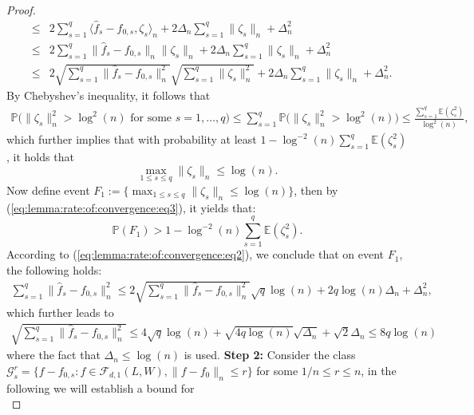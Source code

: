 \documentclass[11pt, preprint]{imsart}
\numberwithin{equation}{section}
\def \mcF{\mathcal{F}}
\def \mcG{\mathcal{G}}
\def \ev{\mathbb{E}}
\def \pr{\mathbb{P}}
\theoremstyle{plain}
\theoremstyle{definition}
\begin{document}
\begin{proof}
\begin{eqnarray}
&\leq&2\sum_{s=1}^q\langle \widehat{f}_s- f_{0,s}, \zeta_s  \rangle_n+2\Delta_n\sum_{s=1}^q \|\zeta_s  \|_n+\Delta_n^2\nonumber\\
&\leq& 2\sum_{s=1}^q\|\widehat{f}_s- f_{0,s}\|_n \|\zeta_s\|_n+2\Delta_n\sum_{s=1}^q \|\zeta_s  \|_n+\Delta_n^2\nonumber\\
&\leq&  2\sqrt{\sum_{s=1}^q\|\widehat{f}_s- f_{0,s}\|_n^2} \sqrt{\sum_{s=1}^q\|\zeta_s\|_n^2}+2\Delta_n\sum_{s=1}^q \|\zeta_s  \|_n+\Delta_n^2.\label{eq:lemma:rate:of:convergence:eq2}
\end{eqnarray}
By Chebyshev’s inequality, it follows that
\begin{eqnarray*}
\pr\bigg(\|\zeta_s\|_n^2>\log^2(n) \textrm{ for some } s=1,\ldots, q\bigg)\leq \sum_{s=1}^q\pr\bigg(\|\zeta_s\|_n^2>\log^2(n)\bigg)\leq \frac{\sum_{s=1}^q\ev(\zeta_s^2)}{\log^2(n)},\nonumber
\end{eqnarray*}
which further implies that with probability at least $1-\log^{-2}(n)\sum_{s=1}^q\ev(\zeta_s^2)$, it holds that
\begin{equation}\label{eq:lemma:rate:of:convergence:eq3}
	\max_{1\leq s\leq q}\|\zeta_s\|_n\leq \log(n).
\end{equation}
Now define event $F_1:=\{\max_{1\leq s\leq q}\|\zeta_s\|_n\leq \log(n)\}$, then by (\ref{eq:lemma:rate:of:convergence:eq3}), it yields that:
\begin{equation}\label{eq:lemma:rate:of:convergence:F1}
	 \pr(F_1)>1-\log^{-2}(n)\sum_{s=1}^q\ev(\zeta_s^2).
\end{equation}
According to (\ref{eq:lemma:rate:of:convergence:eq2}), we conclude that on event $F_1$, the following holds:
\begin{eqnarray*}
	\sum_{s=1}^q\|\widehat{f}_s-f_{0,s}\|_n^2\leq  2\sqrt{\sum_{s=1}^q\|\widehat{f}_s- f_{0,s}\|_n^2}\sqrt{q}\log(n)+2q\log(n)\Delta_n+\Delta_n^2,
\end{eqnarray*}
which further leads to
\begin{eqnarray}\label{eq:lemma:rate:of:convergence:step1:conclusion}
	\sqrt{\sum_{s=1}^q\|\widehat{f}_s-f_{0,s}\|_n^2}\leq 4\sqrt{q}\log(n)+\sqrt{4q\log(n)}\sqrt{\Delta_n}+\sqrt{2}\Delta_n\leq 8q\log(n)
\end{eqnarray} 
where the fact that $\Delta_n\leq \log(n)$ is used.
\newline
\noindent \textbf{Step 2:}
Consider the class $\mcG_s^r=\{f-f_{0,s}: f\in \mcF_{d,1}(L, W), \|f-f_0\|_n\leq r\}$ for some $1/n\leq r\leq n$, in the following we will establish a bound for 
\begin{equation*}

\end{equation*}
\end{proof}
\end{document}
